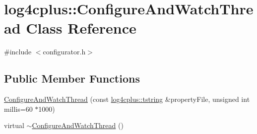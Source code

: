 \hypertarget{classlog4cplus_1_1ConfigureAndWatchThread}{\section{log4cplus\-:\-:Configure\-And\-Watch\-Thread Class Reference}
\label{classlog4cplus_1_1ConfigureAndWatchThread}
}


{\ttfamily \#include $<$configurator.\-h$>$}

\subsection*{Public Member Functions}
\begin{DoxyCompactItemize}
\item 
\hyperlink{classlog4cplus_1_1ConfigureAndWatchThread_a13667f7a5a04f83c8a576b4b2784c3c0}{Configure\-And\-Watch\-Thread} (const \hyperlink{namespacelog4cplus_a3c9287f6ebcddc50355e29d71152117b}{log4cplus\-::tstring} \&property\-File, unsigned int millis=60 $\ast$1000)
\item 
virtual \hyperlink{classlog4cplus_1_1ConfigureAndWatchThread_a70cadec051b96f32eede3702787062e5}{$\sim$\-Configure\-And\-Watch\-Thread} ()
\end{DoxyCompactItemize}


